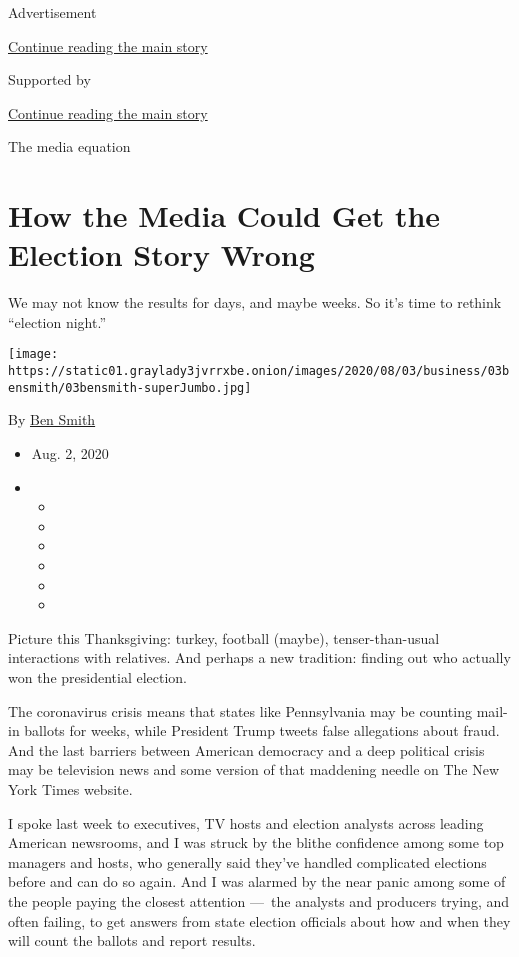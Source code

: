 Advertisement

\protect\hyperlink{after-top}{Continue reading the main story}

Supported by

\protect\hyperlink{after-sponsor}{Continue reading the main story}

The media equation

\hypertarget{how-the-media-could-get-the-election-story-wrong}{%
\section{How the Media Could Get the Election Story
Wrong}\label{how-the-media-could-get-the-election-story-wrong}}

We may not know the results for days, and maybe weeks. So it's time to
rethink ``election night.''

\texttt{[image: https://static01.graylady3jvrrxbe.onion/images/2020/08/03/business/03bensmith/03bensmith-superJumbo.jpg]}

By \href{https://www.nytimes3xbfgragh.onion/by/ben-smith}{Ben Smith}

\begin{itemize}
\item
  Aug. 2, 2020
\item
  \begin{itemize}
  \item
  \item
  \item
  \item
  \item
  \item
  \end{itemize}
\end{itemize}

Picture this Thanksgiving: turkey, football (maybe), tenser-than-usual
interactions with relatives. And perhaps a new tradition: finding out
who actually won the presidential election.

The coronavirus crisis means that states like Pennsylvania may be
counting mail-in ballots for weeks, while President Trump tweets false
allegations about fraud. And the last barriers between American
democracy and a deep political crisis may be television news and some
version of that maddening needle on The New York Times website.

I spoke last week to executives, TV hosts and election analysts across
leading American newsrooms, and I was struck by the blithe confidence
among some top managers and hosts, who generally said they've handled
complicated elections before and can do so again. And I was alarmed by
the near panic among some of the people paying the closest attention
---~the analysts and producers trying, and often failing, to get answers
from state election officials about how and when they will count the
ballots and report results.


